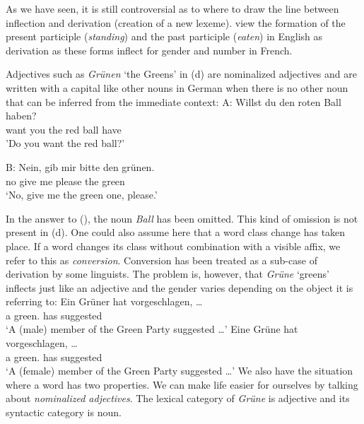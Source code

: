 As we have seen, it is still controversial as to where to draw the line between inflection and derivation (creation of a new lexeme).
\citet*[--264]{SWB2003a} view the formation of the present participle (\emph{standing}) and the past participle (\emph{eaten}) in English
as derivation as these forms inflect for gender and number in French.

Adjectives such as \emph{Grünen} `the Greens' in (d) are nominalized adjectives and are written with a capital like other nouns in German when there is
no other noun that can be inferred from the immediate context:
\ea
\gll A: Willst du den roten Ball haben?\\
	 {} want you the red ball have\\
\glt {} 'Do you want the red ball?'

\gll B: Nein, gib mir bitte den grünen.\\
	{} no give me please the green\\
\glt {} `No, give me the green one, please.'
\z

\noindent
In the answer to (), the noun \emph{Ball} has been omitted. This kind of omission is not present in (d). One could also assume here that
a word class change has taken place. If a word changes its class without combination with a visible affix, we refer to this as \emph{conversion}.
Conversion has been treated as a sub-case of derivation by some linguists.
The problem is, however, that \emph{Grüne} `greens' inflects just like an adjective and the gender varies depending on the object it is referring to:
\eal
\ex 
\gll Ein Grüner hat vorgeschlagen, \ldots\\
	 a green.\mas{} has suggested\\
\glt `A (male) member of the Green Party suggested \ldots'
\ex 
\gll Eine Grüne hat vorgeschlagen, \ldots\\
	 a green.\fem{} has suggested\\
\glt `A (female) member of the Green Party suggested \ldots'
\zl
We also have the situation where a word has two properties. We can make
life easier for ourselves by talking about \emph{nominalized adjectives}. The lexical
category of \emph{Grüne} is adjective and its syntactic category is noun.

